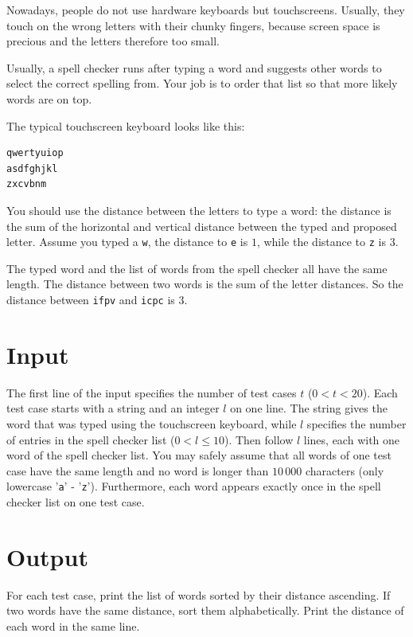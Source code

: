 Nowadays, people do not use hardware keyboards but touchscreens. Usually, they
touch on the wrong letters with their chunky fingers, because screen space is
precious and the letters therefore too small.

Usually, a spell checker runs after typing a word and suggests other words to
select the correct spelling from. Your job is to order that list so that more
likely words are on top.

The typical touchscreen keyboard looks like this:
\begin{verbatim}
qwertyuiop
asdfghjkl
zxcvbnm
\end{verbatim}

You should use the distance between the letters to type a word: the distance is
the sum of the horizontal and vertical distance between the typed and proposed
letter. Assume you typed a {\tt w}, the distance to {\tt e} is $1$, while the
distance to {\tt z} is $3$.

The typed word and the list of words from the spell checker all have the same
length. The distance between two words is the sum of the letter distances.
So the distance between {\tt ifpv} and {\tt icpc} is $3$.

\section*{Input}
The first line of the input specifies the number of test cases $t$ ($0 < t <
20$). Each test case starts with a string and an integer $l$ on one line. The
string gives the word that was typed using the touchscreen keyboard, while $l$
specifies the number of entries in the spell checker list ($0 < l \le 10$).
Then follow $l$ lines, each with one word of the spell checker list. You may
safely assume that all words of one test case have the same length and no word
is longer than $10\,000$ characters (only lowercase '{\tt a}' - '{\tt z}').
Furthermore, each word appears exactly once in the spell checker list on one test case.

\section*{Output}
For each test case, print the list of words sorted by their distance ascending.
If two words have the same distance, sort them alphabetically. Print the
distance of each word in the same line.
